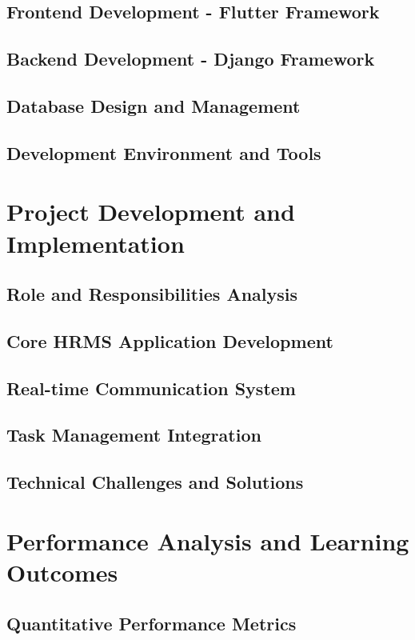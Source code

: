 \documentclass[a4paper, 11pt, oneside]{report}
\begin{document}
\section{Frontend Development - Flutter Framework}
\section{Backend Development - Django Framework}
\section{Database Design and Management}
\section{Development Environment and Tools}


\chapter{Project Development and Implementation}
\section{Role and Responsibilities Analysis}
\section{Core HRMS Application Development}
\section{Real-time Communication System}
\section{Task Management Integration}
\section{Technical Challenges and Solutions}


\chapter{Performance Analysis and Learning Outcomes}
\section{Quantitative Performance Metrics}
\end{document}
